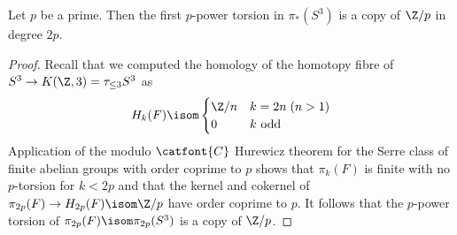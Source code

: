 \begin{corollary}
	Let $p$ be a prime.
	Then the first $p$-power torsion in $\pi_*(S^3)$ is a copy of $\Zn{p}$ in degree $2p$.
\end{corollary}
\begin{proof}
	Recall that we computed the homology of the homotopy fibre of $S^3 \to K(\Z, 3) = \tau_{\leq 3} S^3$ as
	\begin{equation*}
		H_k(F) \isom \begin{cases}
			\Z / n 	& k = 2n\; (n > 1) \\
			0 		& k \text{ odd}
		\end{cases}
	\end{equation*}
	Application of the modulo $\catfont{C}$ Hurewicz theorem for the Serre class of finite abelian groups with order coprime to $p$ shows that $\pi_k(F)$ is finite with no $p$-torsion for $k < 2p$ and that the kernel and cokernel of $\pi_{2p}(F) \to H_{2p}(F) \isom \Zn{p}$ have order coprime to $p$.
	It follows that the $p$-power torsion of $\pi_{2p}(F) \isom \pi_{2p}(S^3)$ is a copy of $\Zn{p}$.
\end{proof}

